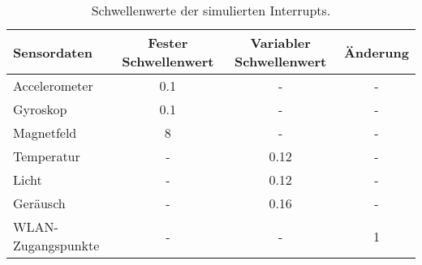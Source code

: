 \begin{table}[h!]
    \centering
    \begin{tabular}{ | l | c | c | c | }
        \hline
        Sensordaten & Fester Schwellenwert & Variabler Schwellenwert & Änderung \\\hline
        Accelerometer & 0.1 & - & - \\\hline
        Gyroskop & 0.1 & - & - \\\hline
        Magnetfeld & 8 & - & - \\\hline
        Temperatur & - & 0.12 & - \\\hline
        Licht & - & 0.12 & - \\\hline
        Geräusch & - & 0.16 & - \\\hline
        WLAN-Zugangspunkte & - & - & 1 \\\hline
    \end{tabular}
    \caption{Schwellenwerte der simulierten Interrupts.}
    \label{tab:interrupt_values}
\end{table}

